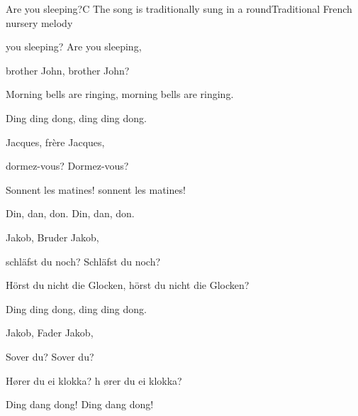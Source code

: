 \begin{SBSong}{Are you sleeping?}{C}
    {The song is traditionally sung in a round}{Traditional French nursery melody}
  \begin{SBVerse}
     you sleeping? Are you sleeping, 

    brother John, brother John?

    Morning bells are ringing, morning bells are ringing. 

    Ding ding dong, ding ding dong.
  \end{SBVerse}
  \begin{SBVerse}
     Jacques, fr\`{e}re Jacques, 
    
    dormez-vous? Dormez-vous?

    Sonnent les matines! sonnent les matines!

    Din, dan, don. Din, dan, don.
  \end{SBVerse}
  \begin{SBVerse}
     Jakob, Bruder Jakob,  

    schl\"{a}fst du noch? Schl\"{a}fst du noch?
    
    H\"{o}rst du nicht die Glocken, h\"{o}rst du nicht die Glocken? 

    Ding ding dong, ding ding dong.
  \end{SBVerse}
  \begin{SBVerse}
     Jakob, Fader Jakob,  
  
    Sover du? Sover du?
    
    H\o rer du ei klokka? h \o rer du ei klokka?
    
    Ding dang dong! Ding dang dong!
  \end{SBVerse}
\end{SBSong}

